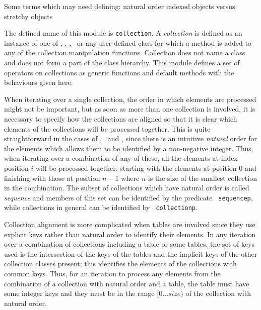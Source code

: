 \label{collection}
%
\begin{optPrivate}
    Some terms which may need defining: natural order indexed objects versus
    stretchy objects
\end{optPrivate}
%
\begin{optDefinition}
%
The defined name of this module is {\tt collection}.  A {\em collection\/}
is defined as an instance of one of , , ,
\ or any user-defined class for which a method is added to any of
the collection manipulation functions.  Collection does not name a class and
does not form a part of the class hierarchy.  This module defines a set of
operators on collections as generic functions and default methods with the
behaviours given here.

When iterating over a single collection, the order in which elements are
processed might not be important, but as soon as more than one collection is
involved, it is necessary to specify how the collections are
aligned so that it is clear which elements
of the collections will be processed together.  This is quite straightforward in
the cases of , \ and , since there is an
intuitive {\em natural\/} order for the elements which allows them to be
identified by a non-negative integer.  Thus, when iterating over a combination
of any of these, all the elements at index position $i$ will be processed
together, starting with the elements at position $0$ and finishing with those at
position $n-1$ where $n$ is the size of the smallest collection in the
combination.  The subset of collections which have natural order is called {\em
    sequence\/} and members of this set can be identified by the predicate {\tt
    sequencep}, while collections in general can be identified by {\tt
    collectionp}.

Collection alignment is more complicated when tables are involved since they use
explicit keys rather than natural order to identify their elements.  In any
iteration over a combination of collections including a table or some tables,
the set of keys used is the intersection of the keys of the tables and the
implicit keys of the other collection classes present; this identifies the
elements of the collections with common keys.  Thus, for an iteration to process
any elements from the combination of a collection with natural order and a
table, the table must have some integer keys and they must be in the range
$[0\ldots{}size)$ of the collection with natural order.


\end{optDefinition}
